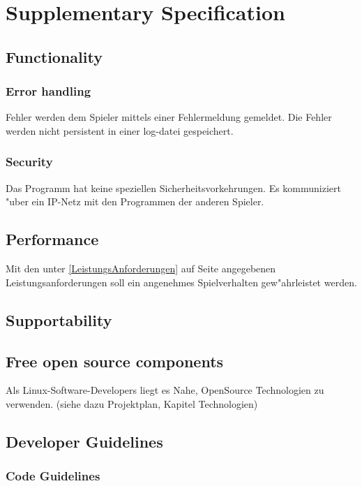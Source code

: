 \chapter{Supplementary Specification}

\section{Functionality}

\subsection{Error handling}
Fehler werden dem Spieler mittels einer Fehlermeldung gemeldet.
Die Fehler werden nicht persistent in einer log-datei gespeichert.

\subsection{Security}
Das Programm hat keine speziellen Sicherheitsvorkehrungen. Es kommuniziert "uber ein IP-Netz mit den Programmen der anderen Spieler.

\section{Performance}
Mit den unter \ref{LeistungsAnforderungen} auf Seite \pageref{LeistungsAnforderungen} angegebenen Leistungsanforderungen soll ein angenehmes Spielverhalten gew"ahrleistet werden.
\section{Supportability}

\section{Free open source components}
Als Linux-Software-Developers liegt es Nahe, OpenSource Technologien zu verwenden.
(siehe dazu Projektplan, Kapitel Technologien)

\section{Developer Guidelines}

\subsection{Code Guidelines}

